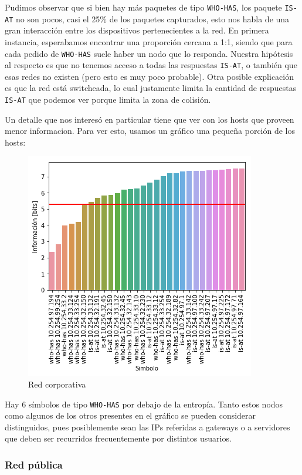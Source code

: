 Pudimos observar que si bien hay más paquetes de tipo \texttt{WHO-HAS}, los paquete \texttt{IS-AT} no son pocos, casi el 25\% de los paquetes capturados, esto nos habla de una gran interacción entre los dispositivos pertenecientes a la red. En primera instancia, esperabamos encontrar una proporción cercana a 1:1, siendo que para cada pedido de \texttt{WHO-HAS} suele haber un nodo que lo responda. Nuestra hipótesis al respecto es que no tenemos acceso a todas las respuestas \texttt{IS-AT}, o también que esas redes no existen (pero esto es muy poco probable). Otra posible explicación es que la red está switcheada, lo cual justamente limita la cantidad de respuestas \texttt{IS-AT} que podemos ver porque limita la zona de colisión.

Un detalle que nos interesó en particular tiene que ver con los hosts que proveen menor informacion. Para ver esto, usamos un gráfico una pequeña porción de los hosts:

\begin{figure}[H]
	\centering
	\includegraphics[width=.5\linewidth]{imagenes/despegar_hosts}
	\caption{Red corporativa}
\end{figure}

Hay 6 símbolos de tipo \texttt{WHO-HAS} por debajo de la entropía. Tanto estos nodos como algunos de los otros presentes en el gráfico se pueden considerar distinguidos, pues posiblemente sean las IPs referidas a gateways o a servidores que deben ser recurridos frecuentemente por distintos usuarios.


\subsubsection{Red pública}


